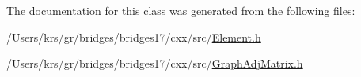 The documentation for this class was generated from the following files\+:\begin{DoxyCompactItemize}
\item 
/\+Users/krs/gr/bridges/bridges17/cxx/src/\hyperlink{_element_8h}{Element.\+h}\item 
/\+Users/krs/gr/bridges/bridges17/cxx/src/\hyperlink{_graph_adj_matrix_8h}{Graph\+Adj\+Matrix.\+h}\end{DoxyCompactItemize}
